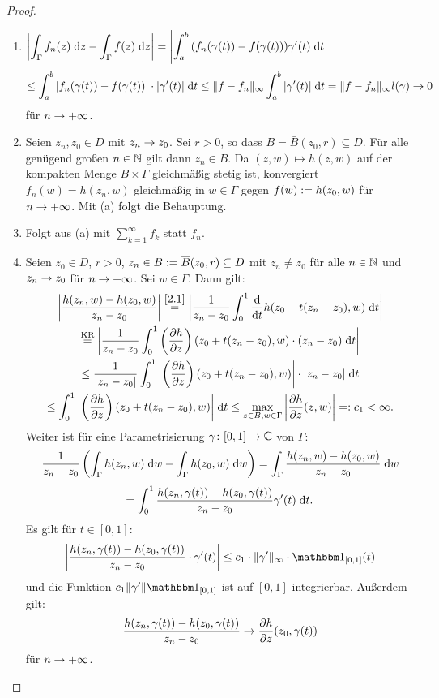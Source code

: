 \documentclass[a4paper,twoside,DIV15,BCOR12mm]{scrbook}
\begin{document}
\begin{proof}\begin{enumerate}
\item $\displaystyle\left\lvert\int_{\Gamma}^{}{f_n(z)}\;\mathrm{d} z-\int_{\Gamma}^{}{f(z)}\;\mathrm{d} z\right\lvert = \left\lvert\int_{a}^{b}{(f_n(\gamma(t))-f(\gamma(t)))\gamma^\prime(t)}\;\mathrm{d} t\right\lvert$
\[\leq\int_{a}^{b}{|f_n(\gamma(t))-f(\gamma(t))|\cdot|\gamma^\prime(t)|}\;\mathrm{d} t\leq\|f-f_n\|_\infty\int_{a}^{b}{|\gamma^\prime(t)|}\;\mathrm{d} t = \|f-f_n\|_\infty l(\gamma)\rightarrow 0\]
für $n\rightarrow+\infty$.

\item Seien $z_n,z_0\in D$ mit $z_n\rightarrow z_0$. Sei $r>0$, so dass $B=\bar{B}(z_0,r)\subseteq D$. Für alle genügend großen $n\in\mathbb{N}$ gilt dann $z_n\in B$. Da $(z,w)\mapsto h(z,w)$ auf der kompakten Menge $B\times\Gamma$ gleichmäßig stetig ist, konvergiert $f_n(w) = h(z_n,w)$ gleichmäßig in $w\in\Gamma$ gegen $f(w):= h(z_0,w)$ für $n\rightarrow+\infty$. Mit (a) folgt die Behauptung.

\item Folgt aus (a) mit $\displaystyle\sum_{k=1}^\infty f_k$ statt $f_n$.

\item Seien $z_0\in D$, $r>0$, $z_n\in B:= \overline{B}(z_0,r)\subseteq D$ mit $z_n\neq z_0$ für alle $n\in\mathbb{N}$ und $z_n\rightarrow z_0$ für $n\rightarrow+\infty$. Sei $w\in\Gamma$. Dann gilt:
\begin{multline*}
\left\lvert\frac{h(z_n,w)-h(z_0,w)}{z_n-z_0}\right\lvert \overset{\eqref{2.1}}{=}\left\lvert\frac{1}{z_n-z_0}\int_{0}^{1}{\frac{\mathrm{d}}{\mathrm{d} t}h(z_0+t(z_n-z_0),w)}\;\mathrm{d} t\right\lvert\\
\overset{\text{KR}}{=}\left\lvert\frac{1}{z_n-z_0}\int_{0}^{1}{\left(\frac{\partial h}{\partial z}\right)(z_0+t(z_n-z_0),w)\cdot(z_n-z_0)}\;\mathrm{d} t\right\lvert\\ 
\leq \frac{1}{\left\lvert z_n-z_0\right\lvert}\int_{0}^{1}{\left\lvert\left(\frac{\partial h}{\partial z}\right)(z_0+t(z_n-z_0),w)\right\lvert\cdot\left\lvert z_n-z_0\right\lvert}\;\mathrm{d} t\\
\leq\int_{0}^{1}{\left\lvert\left(\frac{\partial h}{\partial z}\right)(z_0+t(z_n-z_0),w)\right\lvert}\;\mathrm{d} t \leq \max_{z\in B,w\in\Gamma} \left\lvert\frac{\partial h}{\partial z}(z,w)\right\lvert =: c_1 < \infty.
\end{multline*}
Weiter ist für eine Parametrisierung $\gamma\colon[0,1]\rightarrow\mathbb{C}$ von $\Gamma$:
\[\frac{1}{z_n-z_0}\left(\int_{\Gamma}^{}{h(z_n,w)}\;\mathrm{d} w-\int_{\Gamma}^{}{h(z_0,w)}\;\mathrm{d} w\right) = \int_{\Gamma}^{}{\frac{h(z_n,w)-h(z_0,w)}{z_n-z_0}}\;\mathrm{d} w\]
\[=\int_{0}^{1}{\frac{h(z_n,\gamma(t))-h(z_0,\gamma(t))}{z_n-z_0}\gamma^\prime(t)}\;\mathrm{d} t.\]
Es gilt für $t\in[0,1]$:
\[\abs{\frac{h(z_n,\gamma(t))-h(z_0,\gamma(t))}{z_n-z_0}\cdot\gamma^\prime(t)} \leq c_1\cdot\|\gamma^\prime\|_\infty\cdot\charfnkt{[0,1]}(t)\]
und die Funktion $c_1\|\gamma^\prime\|\charfnkt{[0,1]}$ ist auf $[0,1]$ integrierbar. Außerdem gilt:
\[\frac{h(z_n,\gamma(t))-h(z_0,\gamma(t))}{z_n-z_0}\rightarrow\frac{\partial h}{\partial z}(z_0,\gamma(t))\]
für $n\rightarrow+\infty$.


\end{enumerate}
\end{proof}
\end{document}
